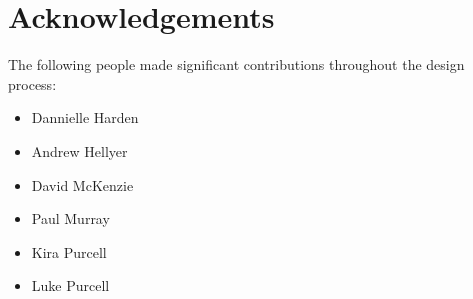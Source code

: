 \documentclass[a4paper, 10pt,notumble]{leaflet}
\begin{document}
\section{Acknowledgements}
%
The following people made significant contributions throughout the design process:
\vspace{-1.75ex}
\begin{multicols}{2}
\begin{itemize}[itemsep=0pt, topsep=0pt, partopsep=0pt]
  \item Dannielle Harden
  \item Andrew Hellyer
  \item David McKenzie
  \item Paul Murray
  \item Kira Purcell
  \item Luke Purcell
\end{itemize}
\end{multicols}

%
\end{document}
